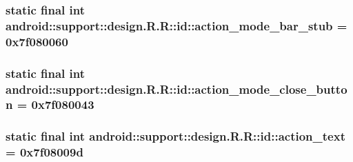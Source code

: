 \hypertarget{classandroid_1_1support_1_1design_1_1_r_1_1id_a74ed9e5631e7a4d26a6cb2b33591398}{
\subsubsection[{action\_\-mode\_\-bar\_\-stub}]{\setlength{\rightskip}{0pt plus 5cm}static final int android::support::design.R.R::id::action\_\-mode\_\-bar\_\-stub = 0x7f080060}}
\label{classandroid_1_1support_1_1design_1_1_r_1_1id_a74ed9e5631e7a4d26a6cb2b33591398}


\hypertarget{classandroid_1_1support_1_1design_1_1_r_1_1id_3036849347d58278bc6257905a39dce7}{
\subsubsection[{action\_\-mode\_\-close\_\-button}]{\setlength{\rightskip}{0pt plus 5cm}static final int android::support::design.R.R::id::action\_\-mode\_\-close\_\-button = 0x7f080043}}
\label{classandroid_1_1support_1_1design_1_1_r_1_1id_3036849347d58278bc6257905a39dce7}


\hypertarget{classandroid_1_1support_1_1design_1_1_r_1_1id_7ceb0269192fbbf364ed6948d856f4bd}{
\subsubsection[{action\_\-text}]{\setlength{\rightskip}{0pt plus 5cm}static final int android::support::design.R.R::id::action\_\-text = 0x7f08009d}}
\label{classandroid_1_1support_1_1design_1_1_r_1_1id_7ceb0269192fbbf364ed6948d856f4bd}


